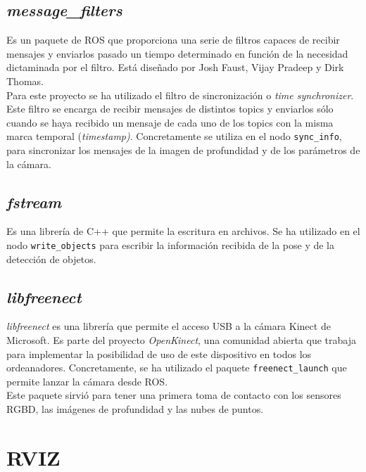 \subsection{\textit{message\_filters}}

Es un paquete de ROS que proporciona una serie de filtros capaces de recibir mensajes y enviarlos pasado un tiempo determinado en función de la necesidad dictaminada por el filtro. Está diseñado por Josh Faust, Vijay Pradeep y Dirk Thomas.\\

Para este proyecto se ha utilizado el filtro de sincronización o \textit{time synchronizer}. Este filtro se encarga de recibir mensajes de distintos topics y enviarlos sólo cuando se haya recibido un mensaje de cada uno de los topics con la misma marca temporal (\textit{timestamp)}. Concretamente se utiliza en el nodo \texttt{sync\_info}, para sincronizar los mensajes de la imagen de profundidad y de los parámetros de la cámara. \\ 

\subsection{\textit{fstream}}

Es una librería de C++ que permite la escritura en archivos. Se ha utilizado en el nodo \texttt{write\_objects} para escribir la información recibida de la pose y de la detección de objetos.\\

\subsection{\textit{libfreenect}}

\textit{libfreenect} es una librería que permite el acceso USB a la cámara Kinect de Microsoft. Es parte del proyecto \textit{OpenKinect}, una comunidad abierta que trabaja para implementar la posibilidad de uso de este dispositivo en todos los ordeanadores. Concretamente, se ha utilizado el paquete \texttt{freenect\_launch} que permite lanzar la cámara desde ROS.\\

Este paquete sirvió para tener una primera toma de contacto con los sensores RGBD, las imágenes de profundidad y las nubes de puntos.\\

\section{RVIZ}

